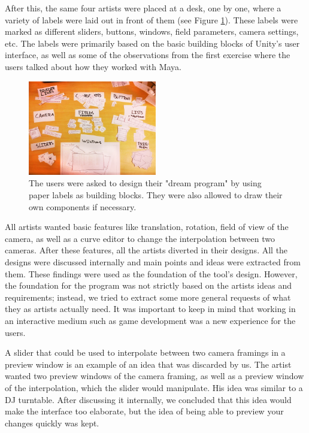 After this, the same four artists were placed at a desk, one by one, where a variety of labels were laid out in front of them (see Figure \ref{fig:labels}). These labels were marked as different sliders, buttons, windows, field parameters, camera settings, etc. The labels were primarily based on the basic building blocks of Unity's user interface, as well as some of the observations from the first exercise where the users talked about how they worked with Maya.


\begin{figure}[htbp]
\centering
\includegraphics[width=0.50\textwidth]{Pics/labels}
\caption{The users were asked to design their "dream program" by using paper labels as building blocks. They were also allowed to draw their own components if necessary.}
\label{fig:labels}
\end{figure}


All artists wanted basic features like translation, rotation, field of view of the camera, as well as a curve editor to change the interpolation between two cameras. After these features, all the artists diverted in their designs. All the designs were discussed internally and main points and ideas were extracted from them. These findings were used as the foundation of the tool's design. However, the foundation for the program was not strictly based on the artists ideas and requirements; instead, we tried to extract some more general requests of what they as artists actually need. It was important to keep in mind that working in an interactive medium such as game development was a new experience for the users.

A slider that could be used to interpolate between two camera framings in a preview window is an example of an idea that was discarded by us. The artist wanted two preview windows of the camera framing, as well as a preview window of the interpolation, which the slider would manipulate. His idea was similar to a DJ turntable. After discussing it internally, we concluded that this idea would make the interface too elaborate, but the idea of being able to preview your changes quickly was kept.

